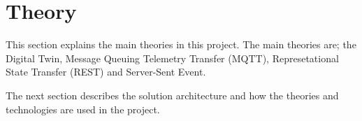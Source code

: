 \section{Theory} \label{sec:theory}
This section explains the main theories in this project. The main theories are; the Digital Twin, Message Queuing Telemetry Transfer (MQTT), Represetational State Transfer (REST) and Server-Sent Event.  








The next section describes the solution architecture and how the theories and technologies are used in the project. 